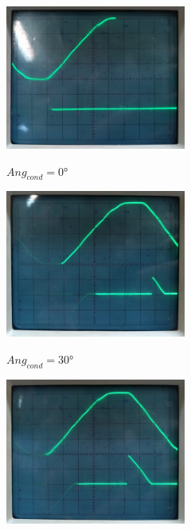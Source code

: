 \begin{figure}[H]
    \begin{center}
        \begin{subfigure}[b]{0.5\textwidth}
        \centering  
            \includegraphics[width=0.65\textwidth]{Imagenes/0grad.jpeg}
        \label{}
        \caption{$Ang_{cond}=0$°}
    \end{subfigure}
    \hfill
        \begin{subfigure}[b]{0.49\textwidth}
        \centering  
            \includegraphics[width=0.65\textwidth]{Imagenes/30grad.jpeg}
        \label{}
        \caption{$Ang_{cond}=30$°}
    \end{subfigure}
    \hfill
        \begin{subfigure}[b]{0.5\textwidth}
        \centering  
            \includegraphics[width=0.65\textwidth]{Imagenes/60grad.jpeg}

\end{subfigure}
\end{center}
\end{figure}

